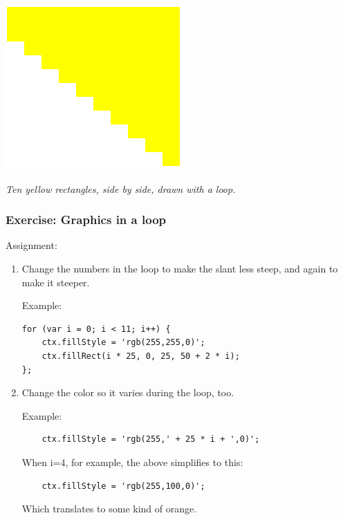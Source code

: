 \documentclass[11pt]{article}
\newcommand{\capt}[1]{\begin{minipage}{0.75\columnwidth}\itshape#1\end{minipage}}
\begin{document}
\begin{center}
\includegraphics[width=0.6\columnwidth]{descending-yellow.png}

\capt{Ten yellow rectangles, side by side, drawn with a loop.}
\end{center}


\subsubsection{Exercise: Graphics in a loop}

Assignment:

\begin{enumerate}

\item Change the numbers in the loop to make the slant less steep, and
  again to make it steeper.

Example:

\begin{verbatim}
for (var i = 0; i < 11; i++) {
    ctx.fillStyle = 'rgb(255,255,0)';
    ctx.fillRect(i * 25, 0, 25, 50 + 2 * i);
};
\end{verbatim}


\item Change the color so it varies during the loop, too.

Example:

\begin{verbatim}
    ctx.fillStyle = 'rgb(255,' + 25 * i + ',0)';
\end{verbatim}

When i=4, for example, the above simplifies to this:

\begin{verbatim}
    ctx.fillStyle = 'rgb(255,100,0)';
\end{verbatim}

Which translates to some kind of orange.


\end{enumerate}
\end{document}
